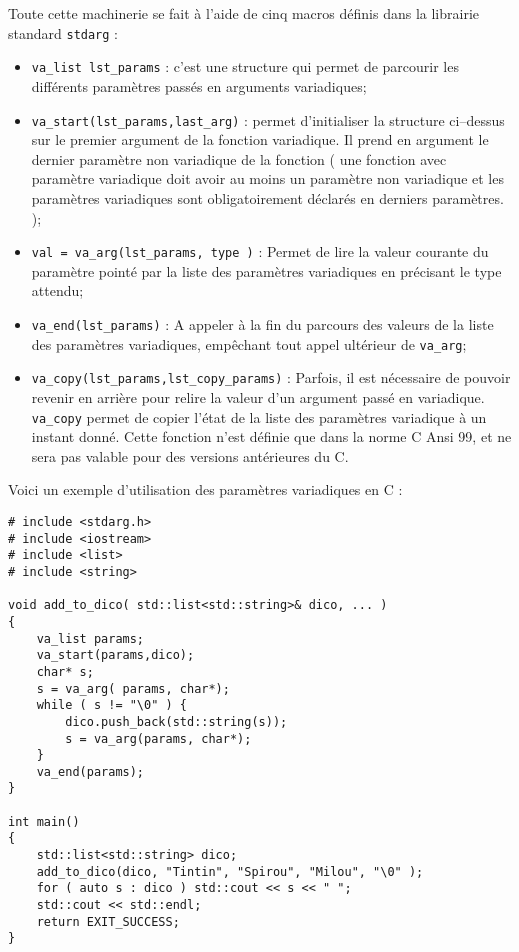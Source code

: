 \documentclass[a4]{article}
\begin{document}
Toute cette machinerie se fait à l'aide de cinq macros définis dans la librairie standard \lstinline$stdarg$ :
\begin{itemize}
\item \verb$va_list lst_params$ : c'est une structure qui permet de parcourir les différents paramètres passés en arguments variadiques;
\item \verb$va_start(lst_params,last_arg)$ : permet d'initialiser la structure ci--dessus sur le premier argument de la fonction variadique. Il prend en
argument le dernier paramètre non variadique de la fonction ( une fonction avec paramètre variadique doit avoir au moins un paramètre
non variadique et les paramètres variadiques sont obligatoirement déclarés en derniers paramètres. );
\item \verb$val = va_arg(lst_params, type )$ : Permet de lire la valeur courante du paramètre pointé par la liste des paramètres
variadiques en précisant le type attendu;
\item \verb$va_end(lst_params)$ : A appeler à la fin du parcours des valeurs de la liste des paramètres variadiques, empêchant tout
appel ultérieur de \verb$va_arg$;
\item \verb$va_copy(lst_params,lst_copy_params)$ : Parfois, il est nécessaire de pouvoir revenir en arrière pour relire la valeur
d'un argument passé en variadique. \verb$va_copy$ permet de copier l'état de la liste des paramètres variadique à un instant donné.
Cette fonction n'est définie que dans la norme C Ansi 99, et ne sera pas valable pour des versions antérieures du C.
\end{itemize}

Voici un exemple d'utilisation des paramètres variadiques en C :

\begin{lstlisting}
# include <stdarg.h>
# include <iostream>
# include <list>
# include <string>

void add_to_dico( std::list<std::string>& dico, ... )
{
    va_list params;
    va_start(params,dico);
    char* s;
    s = va_arg( params, char*);
    while ( s != "\0" ) {
        dico.push_back(std::string(s));
        s = va_arg(params, char*);
    }
    va_end(params);
}

int main()
{
    std::list<std::string> dico;
    add_to_dico(dico, "Tintin", "Spirou", "Milou", "\0" );
    for ( auto s : dico ) std::cout << s << " ";
    std::cout << std::endl;
    return EXIT_SUCCESS;
}
\end{lstlisting}
\end{document}
